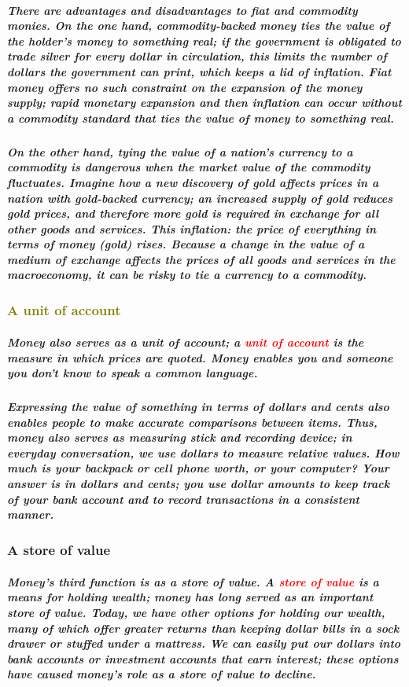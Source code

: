 \documentclass[11pt]{article} %
\begin{document}
\subparagraph*{
There are advantages and disadvantages to fiat and commodity monies. On the one hand, commodity-backed money ties the value of the holder's money to something real; if the government is obligated to trade silver for every dollar in circulation, this limits the number of dollars the government can print, which keeps a lid of inflation. Fiat money offers no such constraint on the expansion of the money supply; rapid monetary expansion and then inflation can occur without a commodity standard that ties the value of money to something real.
}
\subparagraph*{
On the other hand, tying the value of a nation's currency to a commodity is dangerous when the market value of the commodity fluctuates. Imagine how a new discovery of gold affects prices in a nation with gold-backed currency; an increased supply of gold reduces gold prices, and therefore more gold is required in exchange for all other goods and services. This inflation: the price of everything in terms of money (gold) rises. Because a change in the value of a medium of exchange affects the prices of all goods and services in the macroeconomy, it can be risky to tie a currency to a commodity.
}

\subsubsection*{\textcolor{olive}{A unit of account}}
\subparagraph*{
Money also serves as a unit of account; a \textbf{\textcolor{red}{unit of account}} is the measure in which prices are quoted. Money enables you and someone you don't know to speak a common language.
}
\subparagraph*{
Expressing the value of something in terms of dollars and cents also enables people to make accurate comparisons between items. Thus, money also serves as measuring stick and recording device; in everyday conversation, we use dollars to measure relative values. How much is your backpack or cell phone worth, or your computer? Your answer is in dollars and cents; you use dollar amounts to keep track of your bank account and to record transactions in a consistent manner.
}
\subsubsection*{A store of value}
\subparagraph*{Money's third function is as a store of value. A \textbf{\textcolor{red}{store of value}} is a means for holding wealth; money has long served as an important store of value. Today, we have other options for holding our wealth, many of which offer greater returns than keeping dollar bills in a sock drawer or stuffed under a mattress. We can easily put our dollars into bank accounts or investment accounts that earn interest; these options have caused money's role as a store of value to decline.}
\end{document}
